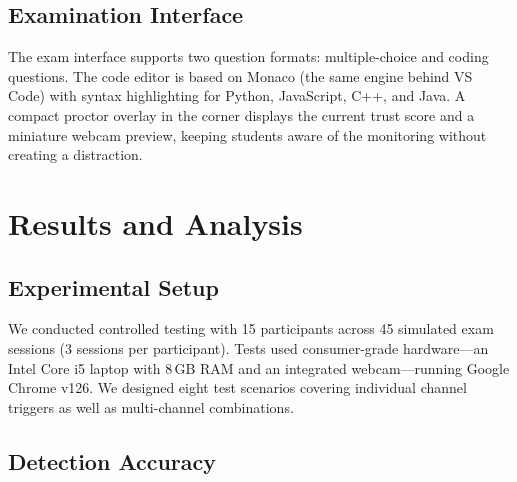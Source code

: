 \documentclass[conference]{IEEEtran}
\begin{document}
\subsection{Examination Interface}

The exam interface supports two question formats: multiple-choice and coding questions. The code editor is based on Monaco (the same engine behind VS Code) with syntax highlighting for Python, JavaScript, C++, and Java. A compact proctor overlay in the corner displays the current trust score and a miniature webcam preview, keeping students aware of the monitoring without creating a distraction.



\section{Results and Analysis}

\subsection{Experimental Setup}

We conducted controlled testing with 15 participants across 45 simulated exam sessions (3 sessions per participant). Tests used consumer-grade hardware---an Intel Core i5 laptop with 8\,GB RAM and an integrated webcam---running Google Chrome v126. We designed eight test scenarios covering individual channel triggers as well as multi-channel combinations.

\subsection{Detection Accuracy}
\end{document}
